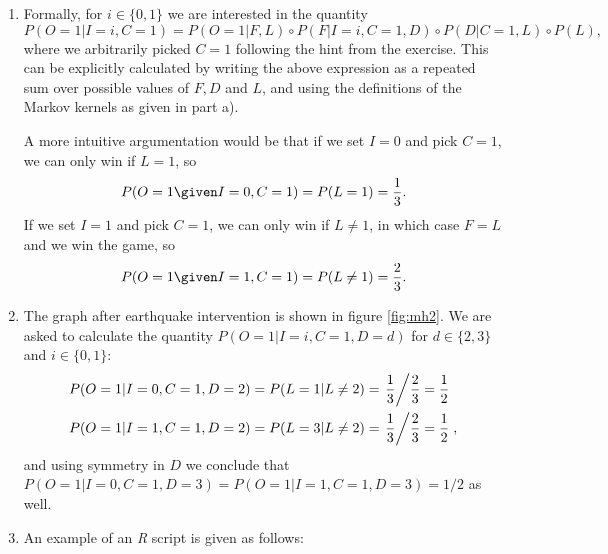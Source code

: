 \begin{enumerate}[label=7.\arabic*]
\begin{gradedsolution}
\begin{enumerate}
            \item {}
            Formally, for $i\in\{0,1\}$ we are interested in the quantity
            \begin{equation*}
                P(O=1|I=i, C=1) = P(O=1 | F, L)\circ P(F|I=i, C=1, D)\circ P(D|C=1, L)\circ P(L),
            \end{equation*}
            where we arbitrarily picked $C=1$ following the hint from the exercise. This can be explicitly calculated by writing the above expression as a repeated sum over possible values of $F, D$ and $L$, and using the definitions of the Markov kernels as given in part a).

            A more intuitive argumentation would be that if we set $I=0$ and pick $C=1$, we can only win if $L=1$, so
            \begin{equation*}
                P(O =1 \given I=0, C=1) = P(L=1) = \frac{1}{3}.
            \end{equation*}
            If we set $I=1$ and pick $C=1$, we can only win if $L\neq 1$, in which case $F=L$ and we win the game, so
            \begin{equation*}
                P(O =1 \given I=1, C=1) = P(L\neq 1) = \frac{2}{3}.
            \end{equation*}

            \item {}
            The graph after earthquake intervention is shown in figure \ref{fig:mh2}.
            We are asked to calculate the quantity $P(O=1|I=i, C=1, D=d)$ for $d\in\{2, 3\}$ and $i\in\{0,1\}$:
            \begin{align*}
                P(O=1|I=0, C=1, D=2) & = P(L=1|L\neq 2) = \left.\frac{1}{3}\middle/ \frac{2}{3} = \frac{1}{2}\right.   \\
                P(O=1|I=1, C=1, D=2) & = P(L=3|L\neq 2) = \left.\frac{1}{3} \middle/ \frac{2}{3} = \frac{1}{2}\right.,
            \end{align*}
            and using symmetry in $D$ we conclude that $P(O=1|I=0, C=1, D=3) = P(O=1|I=1, C=1, D=3) = 1/2$ as well.

            \item {} An example of an \emph{R} script is given as follows:
        \end{enumerate}
    \end{gradedsolution}


\end{enumerate}
